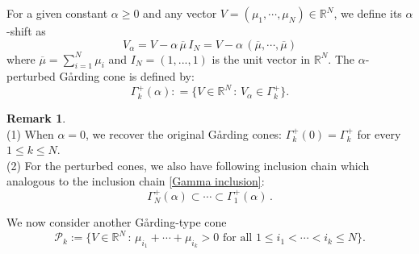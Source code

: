 \documentclass[12pt, twoside]{article}
\theoremstyle{definition}
\newtheorem{remark}[theorem]{Remark}
\numberwithin{equation}{section}
\def \a {\alpha }
\begin{document}
For a given constant $\alpha\geq 0$ and any vector $V=(\mu_{1},\cdots,\mu_{N})\in\mathbb{R}^{N}$, we define its $\a$-shift as
\begin{equation}\label{V alpha}
V_{\alpha}=V-\alpha\,\overline{\mu}\,I_{N}=V-\alpha\,(\overline{\mu},\cdots,\overline{\mu})
\end{equation}
where $\overline{\mu}=\sum_{i=1}^{N}\mu_{i}$ and $I_N=(1,...,1)$ is the unit vector in $\mathbb{R}^{N}$. The $\a$-perturbed Gårding cone is defined by:
\begin{equation}\label{Gamma k alpha}
\Gamma^{+}_{k}(\alpha): =\{V\in\mathbb{R}^{N}\,:\, V_{\alpha}\in \Gamma^{+}_k\}.
\end{equation}
\begin{remark}
\quad\\
(1) When $\a=0$, we recover the original Gårding cones: $\Gamma^{+}_{k}(0)=\Gamma^{+}_{k}$ for every $1\leq k\leq N$.\\
(2) For the perturbed cones, we also have following inclusion chain which analogous to the inclusion chain \eqref{Gamma inclusion}:
\begin{equation}\label{Gamma alpha inclusion}
\Gamma^{+}_{N}(\alpha)\subset \cdots \subset \Gamma^{+}_{1}(\alpha)\,.
\end{equation}
\end{remark}
We now consider another Gårding-type cone
\begin{equation}\label{Pk}
\mathcal{P}_{k}:=\{ V\in \mathbb{R}^N \,: \,\mu_{i_1}+\cdots +\mu_{i_{k}}>0 \textrm{ for all } 1\leq i_1<\cdots< i_{k}\leq N\}.
\end{equation}
 
\end{document}
